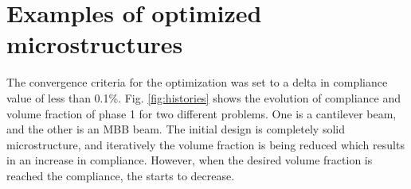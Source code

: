 \documentclass[openright,twoside]{iitkthesis}
\begin{document}
\section{Examples of optimized microstructures}
The convergence criteria for the optimization was set to a delta in compliance value of less than 0.1\%. Fig. \ref{fig:histories} shows the evolution of compliance and volume fraction of phase 1 for two different problems. One is a cantilever beam, and the other is an MBB beam. The initial design is completely solid microstructure, and iteratively the volume fraction is being reduced which results in an increase in compliance. However, when the desired volume fraction is reached the compliance, the starts to decrease.
\begin{figure}[H]
\begin{center}
    \subfloat[]{
}
\end{center}
\end{figure}
\end{document}
